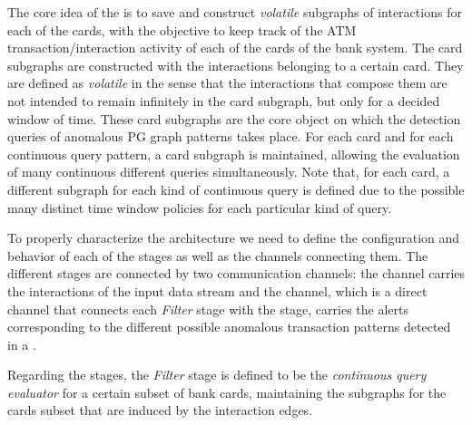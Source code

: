 The core idea of the \DPATM is to save and construct \emph{volatile} subgraphs of interactions for each of the cards, with the objective to keep track of the ATM transaction/interaction activity of each of the cards of the bank system. The card subgraphs are constructed with the interactions belonging to a certain card. They are defined as \emph{volatile} in the sense that the interactions that compose them are not intended to remain infinitely in the card subgraph, but only for a decided window of time. 
These card subgraphs are the core object on which the detection queries of anomalous PG graph patterns takes place. For each card and for each continuous query pattern, a card subgraph is maintained, allowing the evaluation of many continuous different queries simultaneously. Note that, for each card, a different subgraph for each kind of continuous query is defined due to the possible many distinct time window policies for each particular kind of query.


To properly characterize the \DP architecture we need to define the configuration and behavior of each of the stages as well as the channels connecting them. The different stages are connected by two communication channels: the \eventch channel carries the interactions of the input data stream and the \alertch channel, which is a direct channel that connects each \emph{Filter} stage with the \sink stage, carries the alerts corresponding to the different possible anomalous transaction patterns detected in a \filter.



Regarding the stages, the \emph{Filter} stage is defined to be the \textit{continuous query evaluator} for a certain subset of bank cards, maintaining the subgraphs for the cards subset that are induced by the interaction edges.

